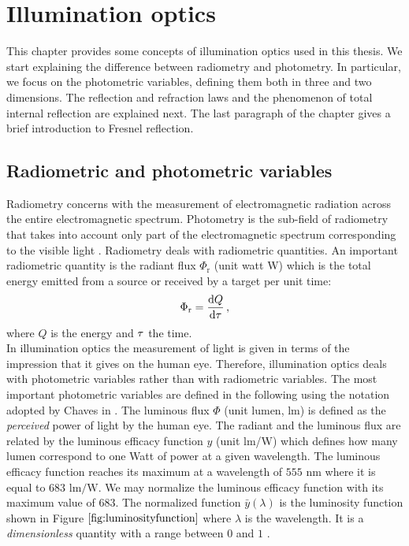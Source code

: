 \chapter{Illumination optics}\label{chap:Illumination optics}
This chapter provides some concepts of illumination optics used in this thesis. We start explaining the difference between radiometry and photometry.
In particular, we focus on the photometric variables, defining them both in three and two dimensions. The reflection and refraction laws and the phenomenon of total internal reflection are explained next. The last paragraph of the chapter gives a brief introduction to Fresnel reflection. 
\section{Radiometric and photometric variables}\label{sec:photometry}
Radiometry concerns with the measurement of electromagnetic radiation across the entire electromagnetic spectrum. Photometry is the sub-field of radiometry that takes into account only part of the electromagnetic spectrum corresponding to the visible light \cite{zalewski1995radiometry}. Radiometry deals with radiometric quantities. An important radiometric quantity  is the radiant flux $\Phi_{\textrm{r}}$ (unit watt \textrm{W}) which is the total energy emitted from a source or received by a target per unit time:
\begin{equation}
\Phi_{\textrm{r}} = \frac{\textrm{d}Q}{\textrm{d}\tau}\,,
\end{equation}
where $Q$ is the energy and $\tau$ the time.\\
\indent In illumination optics the measurement of light is given in terms of the impression that it gives on the human eye. Therefore, illumination optics deals with photometric variables rather than with radiometric variables. The most important photometric variables are defined in the following using the notation adopted by Chaves in \cite{chaves2015introduction}. The luminous flux $\Phi$ (unit lumen, \textrm{lm}) is defined as the \textit{perceived} power of light by the human eye.
 The radiant and the luminous flux are related by the luminous efficacy function $y$ (unit \textrm{lm}/\textrm{W}) which defines how many lumen correspond to one Watt of power at a given wavelength.
 The luminous efficacy function reaches its maximum  at a wavelength of $555$ $\textrm{nm}$ where it is equal to $683$ $\textrm{lm}/\textrm{W}$.
  We may normalize the luminous efficacy function with its maximum value of $683$.
  The normalized function $\bar{y}(\lambda)$ is the luminosity function shown in Figure $\ref{fig:luminosityfunction}$ where $\lambda$ is the wavelength. It is a \textit{dimensionless} quantity with a range between $0$ and $1$ \cite{schubert2005light}.
